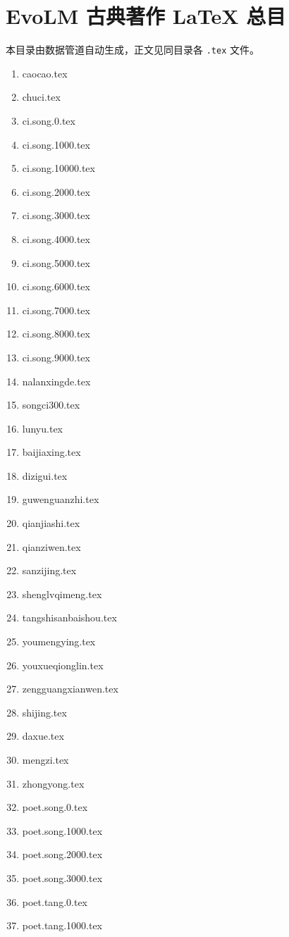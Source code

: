 \documentclass[12pt]{ctexart}
\begin{document}
\section*{EvoLM 古典著作 LaTeX 总目}
本目录由数据管道自动生成，正文见同目录各 \texttt{.tex} 文件。
\begin{enumerate}
\item caocao.tex
\item chuci.tex
\item ci.song.0.tex
\item ci.song.1000.tex
\item ci.song.10000.tex
\item ci.song.2000.tex
\item ci.song.3000.tex
\item ci.song.4000.tex
\item ci.song.5000.tex
\item ci.song.6000.tex
\item ci.song.7000.tex
\item ci.song.8000.tex
\item ci.song.9000.tex
\item nalanxingde.tex
\item songci300.tex
\item lunyu.tex
\item baijiaxing.tex
\item dizigui.tex
\item guwenguanzhi.tex
\item qianjiashi.tex
\item qianziwen.tex
\item sanzijing.tex
\item shenglvqimeng.tex
\item tangshisanbaishou.tex
\item youmengying.tex
\item youxueqionglin.tex
\item zengguangxianwen.tex
\item shijing.tex
\item daxue.tex
\item mengzi.tex
\item zhongyong.tex
\item poet.song.0.tex
\item poet.song.1000.tex
\item poet.song.2000.tex
\item poet.song.3000.tex
\item poet.tang.0.tex
\item poet.tang.1000.tex

\end{enumerate}
\end{document}
